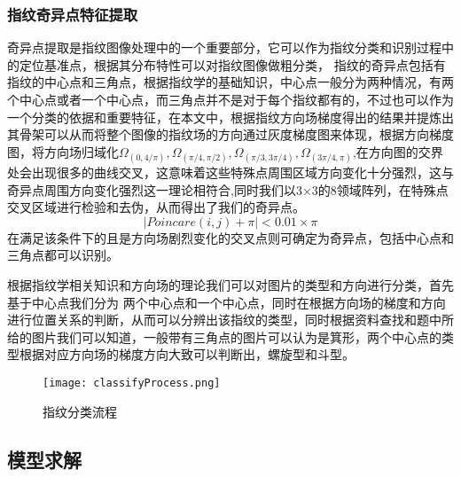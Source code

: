 \documentclass[withoutpreface,bwprint]{cumcmthesis} %
\begin{document}
\subsubsection{指纹奇异点特征提取}
奇异点提取是指纹图像处理中的一个重要部分，它可以作为指纹分类和识别过程中的定位基准点，根据其分布特性可以对指纹图像做粗分类，%
指纹的奇异点包括有指纹的中心点和三角点，根据指纹学的基础知识，中心点一般分为两种情况，有两个中心点或者一个中心点，而三角点并不是对于每个指纹都有的，不过也可以作为一个分类的依据和重要特征，在本文中，根据指纹方向场梯度得出的结果并提炼出其骨架可以从而将整个图像的指纹场的方向通过灰度梯度图来体现，根据方向梯度图，将方向场归域化$\Omega_{(0,4/\pi)},\Omega_{(\pi/4,\pi/2)},\Omega_{(\pi/3,3\pi/4)},\Omega_{(3\pi/4,\pi)}$,在方向图的交界处会出现很多的曲线交叉，这意味着这些特殊点周围区域方向变化十分强烈，这与奇异点周围方向变化强烈这一理论相符合,同时我们以3×3的8领域阵列，在特殊点交叉区域进行检验和去伪，从而得出了我们的奇异点。
\begin{equation}
|Poincare(i,j)+\pi|<0.01×\pi
\end{equation}
在满足该条件下的且是方向场剧烈变化的交叉点则可确定为奇异点，包括中心点和三角点都可以识别。

根据指纹学相关知识和方向场的理论我们可以对图片的类型和方向进行分类，首先基于中心点我们分为
两个中心点和一个中心点，同时在根据方向场的梯度和方向进行位置关系的判断，从而可以分辨出该指纹的类型，同时根据资料查找和题中所给的图片我们可以知道，一般带有三角点的图片可以认为是箕形，两个中心点的类型根据对应方向场的梯度方向大致可以判断出，螺旋型和斗型。

\begin{figure}[!h]
	\centering
	\texttt{[image: classifyProcess.png]}
	\caption{指纹分类流程}
\end{figure}

\subsection{模型求解}
\end{document}
